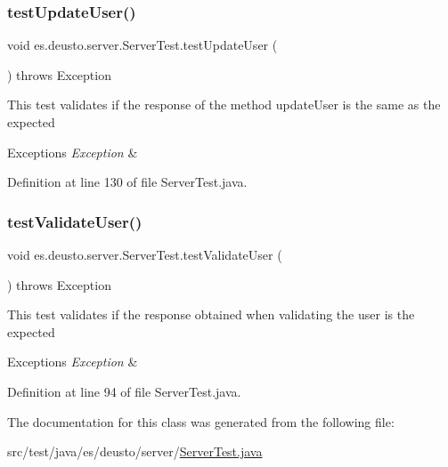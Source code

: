 \mbox{\label{classes_1_1deusto_1_1server_1_1_server_test_ad64ead953df265e40d07bdc0ab11137c}} 
\subsubsection{\texorpdfstring{test\+Update\+User()}{testUpdateUser()}}
{\footnotesize\ttfamily void es.\+deusto.\+server.\+Server\+Test.\+test\+Update\+User (\begin{DoxyParamCaption}{ }\end{DoxyParamCaption}) throws Exception}

This test validates if the response of the method update\+User is the same as the expected 
\begin{DoxyExceptions}{Exceptions}
{\em Exception} & \\
\hline
\end{DoxyExceptions}


Definition at line 130 of file Server\+Test.\+java.

\mbox{\label{classes_1_1deusto_1_1server_1_1_server_test_af493f29fde42af9e7d4c065f49bf8502}} 
\subsubsection{\texorpdfstring{test\+Validate\+User()}{testValidateUser()}}
{\footnotesize\ttfamily void es.\+deusto.\+server.\+Server\+Test.\+test\+Validate\+User (\begin{DoxyParamCaption}{ }\end{DoxyParamCaption}) throws Exception}

This test validates if the response obtained when validating the user is the expected 
\begin{DoxyExceptions}{Exceptions}
{\em Exception} & \\
\hline
\end{DoxyExceptions}


Definition at line 94 of file Server\+Test.\+java.



The documentation for this class was generated from the following file\+:\begin{DoxyCompactItemize}
\item 
src/test/java/es/deusto/server/\hyperlink{_server_test_8java}{Server\+Test.\+java}\end{DoxyCompactItemize}
